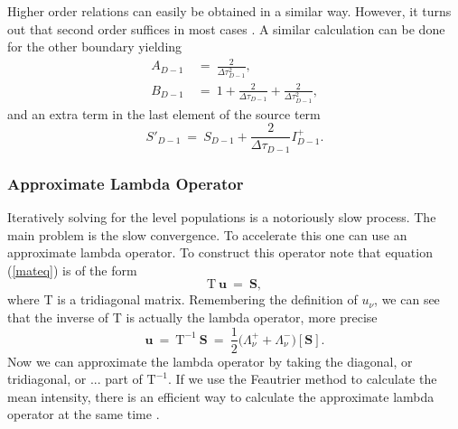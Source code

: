 \documentclass[]{article}
\begin{document}
Higher order relations can easily be obtained in a similar way. However, it turns out that second order suffices in most cases \cite{MihalasMihalas}. A similar calculation can be done for the other boundary yielding
\begin{equation}
\begin{split}
A_{D-1} \ &= \ \frac{2}{\Delta\tau_{D-1}^{2}}, \\
B_{D-1} \ &= \ 1 + \frac{2}{\Delta\tau_{D-1}} + \frac{2}{\Delta\tau_{D-1}^{2}},
\end{split}
\end{equation}
and an extra term in the last element of the source term
\begin{equation}
S'_{D-1}  \ = \  S_{D-1} + \frac{2}{\Delta\tau_{D-1}} I_{D-1}^{+}.
\end{equation}


\subsubsection{Approximate Lambda Operator}

Iteratively solving for the level populations is a notoriously slow process. The main problem is the slow convergence. To accelerate this one can use an approximate lambda operator. To construct this operator note that equation (\ref{mateq}) is of the form
\begin{equation}
\text{T} \ \textbf{u} \ = \ \textbf{S},
\end{equation}
where T is a tridiagonal matrix. Remembering the definition of  $u_{\nu}$, we can see that the inverse of T is actually the lambda operator, more precise
\begin{equation}
\textbf{u} \ = \ \text{T}^{-1} \ \textbf{S} \ = \ \frac{1}{2}\big(\Lambda^{+}_{\nu} + \Lambda^{-}_{\nu} \big) [\textbf{S}].
\end{equation}
Now we can approximate the lambda operator by taking the diagonal, or tridiagonal, or ... part of $\text{T}^{-1}$. If we use the Feautrier method to calculate the mean intensity, there is an efficient way to calculate the approximate lambda operator at the same time \cite{Rybicki1991}.

\bigskip
\end{document}
